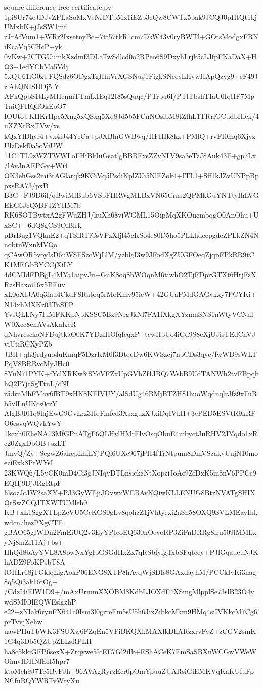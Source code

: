 \documentclass[11pt]{article}
\theoremstyle{definition}
\theoremstyle{remark}
\begin{document}
\begin{filecontents*}[overwrite]{square-difference-free-certificate.py}
1pi8Ur74eJDJvZPLaSoMxVeNrDTbMx1iEZb3cQw8CWTx5bak9JCQJ0pHtQt1kjUMxbK+jJsSW1mf
zJrAfVum1+WRr2IxsetnyBc+7tt57tkR1cm7DkW43v0ryBWTl+GOtsModgxFRNiKcaVq5CHcP+yk
0vKw+2CTGUumkXzdmf3DLcTwSdlcd0o2RPeo6S9DxyhLrjk5cLJfpFKaDaX+HQ3+1edYCbMa5Vdj
5xQU61lG0zUFQSdz6ODgzTgHhiVrXGSNuJ1FigkSNeqsLHvwHApQzvg9+eF49JrlAhQNISDDj5lY
AFkQpbS1tLyMHcnmTTmfxIEqJ2I85sQuqc/PTrbu6I/PTlTbshTIaU0IqHF7MpTniQFHQdOkEoO7
IOUtoUKHKrHpe5Xng5xQSxq5Xq8Jd5b5FCnNOsibM8tZfhL1TRrlGCudbHiek/4uXZXtRxTVw/xs
kQxYlDhyr4+vx4iJ44YcCa+pJXBlnGWBwq/HFHIk8kz+PMlQ+rvFI0mq6XjvzUlzDskf0a5oViUW
11C1TL9zWZTWWLoFHiBkIuGsatlgBBBFxsZZvNLV9sa3eTzJ8Auk43E+gp7Lx/lAvJnAEPGv+Wi4
QK3ehGss2mi3tAGlarqk9KCiVq5PsdiKplZUi5NlEZok4+ITL1+Sff1kJZvUNPpBppxsRA73/pxD
B3G+FJ9D6il/qBwiMlBub6VSpFHRWgMLBxVN65Crns2QPMkGuYNTtyIhLVGEEG6JcQ5BFJZYHM7b
RK6SOTBwtxA2gFWuZHJ/kuXh68viWGML15OipMqXKOucmbqgO0AnOhu+UxSC++6dQ8gCS9OlBlrk
pDrBug1VQknE2+qTSiRTiCsVPzXfjl45cKSo4e80D5ho5PLLhdcepgdeZPLkZN4NnobtnWxnMVQo
qCAwOR5voyIsD6uWSFSzcWjLlM/yzblgI3w9JFodXgZUGFOeqZjqpFPkRR9tCK1MEGbRYCCjXiLY
4dCMIdFDBgL4MYa1aipvJu+GuK8oq8bWOqnM6tiwhO2TjFDprGTXt6HrjFzXRzsHaxoi16x5BEuv
xL0oXIJA0q3fnu4CkdF8Ratoq5rMoKmv95icW+42GUaPMdGAGvkxy7PCYKi+N14xhMXKz03TnSFP
YvsQLLNy7IuMFKKpNpKSSC5Bz9NrgJkNl7FA1fXkgXYznmSNS1nWtyVCNnlW0Xcc8ehAVsAknKeR
qNhvresckoNFDujtkaO0K7YDzfHOfqfcqxP+tcwHpUo4iGd9S8eXjUJisTEdCnVJviUtiRCXyPZb
JBH+qh3jrdyuo4uKmqF5DzrKM0f3DtqeDw6KWSzcj7nbCDs3qyc/fwWB9sWLTPqV8BRRvcMyJHc0
8YuN71PYK+fYclXRKw8iSYcVFZxUpGVbZf1JRQ7WsbB9UdTANWh2tvFBpqbhQ2P7jcSgTtnL/cNI
r5drnMhFMov6fBT9xHK8KFIVUY/alSdUg46BMjBTZH81huoWqduqlrJfz9xFuRb5vlLnUKcs0crY
AlgBJI01q8lhjEwG9GvLrz3HqFmfed3XsxguzXJxiDqIVkH+3ePED5ESVtR9kRFO6csvqWQvkYwY
1kcxh0EheNA13MfGPnATgF6QLHvlHMrElvOsqObuE4mbyctJuRHV2JYqdo1xRc20ZgxDbOB+szLT
JmvQ/Zy+ScgwZ6ahcpLhfLYjPQi6UXc967jPH4fTrNtpum8DmVSzakvUujN10moeziExk8PtWYsI
23KWQ6/L5yCK0mD4Ci3gJNIqvDTLnsickzNtXopziJoAc9ZfDxK5m8nV6PPCc9EQHj9DjJRgRtpF
hlsozJcJW2saXY+PJ3GyWEjiJOvwxWEBAvKQiwKLLENUG8BtzNVATgSHIXQrSwZCQJTXWTUMleh0
KB+xL1SggXTLpZcVU5CcKGS0gLv8qohzZ1jVhtyexi2nSn58OXQ9SVLMEayIhkwdcn7hezPXgCTE
gBAO65gIWDn2FmEiUQ2v3EyYPIeoEQ630nOevoRP3ZiFnDRRg8iru509lMMLxyNj8mZl11Aj+bs+
HhQd8bAyYVL8A8pwNxYgIpGSGdHxZx7qRSbfyfgTxbSFqteey+PJlGqaueuNJKhADZ9FoKPsbT8A
fOHLr68jTGklqLigAokP06ENG8XTP8hAvqWjSDIs8GAxdayhM/PCCkIvKi3nag8q5Qi3ak16tOg+
/CdzI4iElW1D9+/mAxUrmmXXOBM8KdbLJOXdF4XSmgMlpplSe73slB23O4ywdSMIOlEQWEslgzhP
e22+zNIak6ryuFX641c0Ism3l0grreEm5sU5h6JixZibkcMkm9HMq4siIVKkcM7Cg6prTvvjXehw
uawPHuTbWK3FSUXw6FZqEn5VFiBKQXkMAXlkDhARzxrvFvZ+zCGV2smK1G4q3Db5QZUpZLLsRPLH
ha8c5kkiGEP6sexX+Zrqywe5IcEE7Gl2iIk+EShACeK7EmSaSBXnWCGwVWeWOimvIDHNfEH5hpr7
ktoMch9J7Te5BvFJh+96AVAgRyrzEcr0pOmYpuuZUARsiGiEMKVqKaKUfuFpNCfuRQYWRTvWtyXu

\end{filecontents*}
\end{document}
